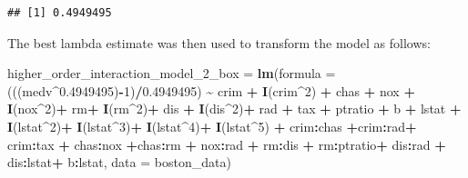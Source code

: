 \documentclass[
]{article}
\newenvironment{Shaded}{\begin{snugshade}}{\end{snugshade}}
\newcommand{\AttributeTok}[1]{\textcolor[rgb]{0.13,0.29,0.53}{#1}}
\newcommand{\CommentTok}[1]{\textcolor[rgb]{0.56,0.35,0.01}{\textit{#1}}}
\newcommand{\DecValTok}[1]{\textcolor[rgb]{0.00,0.00,0.81}{#1}}
\newcommand{\FloatTok}[1]{\textcolor[rgb]{0.00,0.00,0.81}{#1}}
\newcommand{\FunctionTok}[1]{\textcolor[rgb]{0.13,0.29,0.53}{\textbf{#1}}}
\newcommand{\NormalTok}[1]{#1}
\newcommand{\OtherTok}[1]{\textcolor[rgb]{0.56,0.35,0.01}{#1}}
\newcommand{\SpecialCharTok}[1]{\textcolor[rgb]{0.81,0.36,0.00}{\textbf{#1}}}
\begin{document}
\begin{Shaded}
\end{Shaded}

\begin{verbatim}
## [1] 0.4949495
\end{verbatim}

The best lambda estimate was then used to transform the model as
follows:

\begin{Shaded}
\begin{Highlighting}[]
\NormalTok{higher\_order\_interaction\_model\_2\_box }\OtherTok{=} \FunctionTok{lm}\NormalTok{(}\AttributeTok{formula =}\NormalTok{ (((medv}\SpecialCharTok{\^{}}\FloatTok{0.4949495}\NormalTok{)}\SpecialCharTok{{-}}\DecValTok{1}\NormalTok{)}\SpecialCharTok{/}\FloatTok{0.4949495}\NormalTok{) }\SpecialCharTok{\textasciitilde{}}\NormalTok{ crim }\SpecialCharTok{+} \FunctionTok{I}\NormalTok{(crim}\SpecialCharTok{\^{}}\DecValTok{2}\NormalTok{) }\SpecialCharTok{+}\NormalTok{ chas }\SpecialCharTok{+}\NormalTok{ nox }\SpecialCharTok{+} \FunctionTok{I}\NormalTok{(nox}\SpecialCharTok{\^{}}\DecValTok{2}\NormalTok{)}\SpecialCharTok{+}\NormalTok{ rm}\SpecialCharTok{+} \FunctionTok{I}\NormalTok{(rm}\SpecialCharTok{\^{}}\DecValTok{2}\NormalTok{)}\SpecialCharTok{+}\NormalTok{ dis }\SpecialCharTok{+} \FunctionTok{I}\NormalTok{(dis}\SpecialCharTok{\^{}}\DecValTok{2}\NormalTok{)}\SpecialCharTok{+}\NormalTok{ rad }\SpecialCharTok{+}\NormalTok{ tax }\SpecialCharTok{+}\NormalTok{ ptratio }\SpecialCharTok{+}\NormalTok{ b }\SpecialCharTok{+}\NormalTok{ lstat }\SpecialCharTok{+} \FunctionTok{I}\NormalTok{(lstat}\SpecialCharTok{\^{}}\DecValTok{2}\NormalTok{)}\SpecialCharTok{+} \FunctionTok{I}\NormalTok{(lstat}\SpecialCharTok{\^{}}\DecValTok{3}\NormalTok{)}\SpecialCharTok{+} \FunctionTok{I}\NormalTok{(lstat}\SpecialCharTok{\^{}}\DecValTok{4}\NormalTok{)}\SpecialCharTok{+} \FunctionTok{I}\NormalTok{(lstat}\SpecialCharTok{\^{}}\DecValTok{5}\NormalTok{) }\SpecialCharTok{+}\NormalTok{ crim}\SpecialCharTok{:}\NormalTok{chas  }\SpecialCharTok{+}\NormalTok{crim}\SpecialCharTok{:}\NormalTok{rad}\SpecialCharTok{+}\NormalTok{ crim}\SpecialCharTok{:}\NormalTok{tax }\SpecialCharTok{+}\NormalTok{ chas}\SpecialCharTok{:}\NormalTok{nox }\SpecialCharTok{+}\NormalTok{chas}\SpecialCharTok{:}\NormalTok{rm }\SpecialCharTok{+}\NormalTok{ nox}\SpecialCharTok{:}\NormalTok{rad }\SpecialCharTok{+}\NormalTok{ rm}\SpecialCharTok{:}\NormalTok{dis }\SpecialCharTok{+}\NormalTok{ rm}\SpecialCharTok{:}\NormalTok{ptratio}\SpecialCharTok{+}\NormalTok{ dis}\SpecialCharTok{:}\NormalTok{rad }\SpecialCharTok{+}\NormalTok{ dis}\SpecialCharTok{:}\NormalTok{lstat}\SpecialCharTok{+}\NormalTok{ b}\SpecialCharTok{:}\NormalTok{lstat, }\AttributeTok{data =}\NormalTok{ boston\_data)}

\end{Highlighting}
\end{Shaded}
\end{document}
